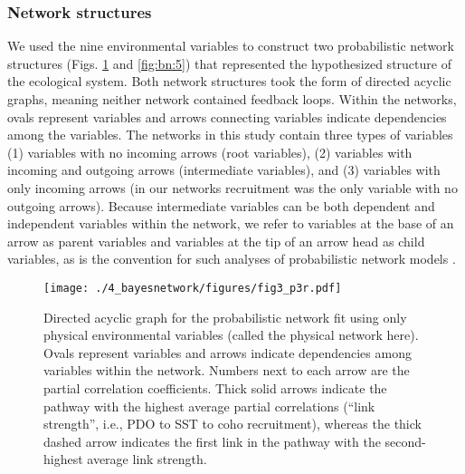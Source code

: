 \subsubsection{Network structures}

We used the nine environmental variables to construct two probabilistic network
structures (Figs. \ref{fig:bn:4} and \ref{fig:bn:5}) that represented the
hypothesized structure of the ecological system. Both network structures took
the form of directed acyclic graphs, meaning neither network contained feedback
loops. Within the networks, ovals represent variables and arrows connecting
variables indicate dependencies among the variables.  The networks in this study
contain three types of variables (1) variables with no incoming arrows (root
variables), (2) variables with incoming and outgoing arrows (intermediate
variables), and (3) variables with only incoming arrows (in our networks
recruitment was the only variable with no outgoing arrows). Because intermediate
variables can be both dependent and independent variables within the network, we
refer to variables at the base of an arrow as parent variables and variables at
the tip of an arrow head as child variables, as is the convention for such
analyses of probabilistic network models \citep{Koller2009a, Korb2004a}.

\begin{figure}[htbp]
  \centering \texttt{[image: ./4\_bayesnetwork/figures/fig3\_p3r.pdf]}
  \caption[Directed acyclic graph for the probabilistic network fit using only
           physical environmental variables.]{Directed acyclic graph for the
           probabilistic network fit using only physical environmental variables
           (called the physical network here). Ovals represent variables and
           arrows indicate dependencies among variables within the network.
           Numbers next to each arrow are the partial correlation coefficients.
           Thick solid arrows indicate the pathway with the highest average
           partial correlations (``link strength'', i.e., PDO to SST to coho
           recruitment), whereas the thick dashed arrow indicates the first link
           in the pathway with the second-highest average link strength.}
  \label{fig:bn:4}
\end{figure}

